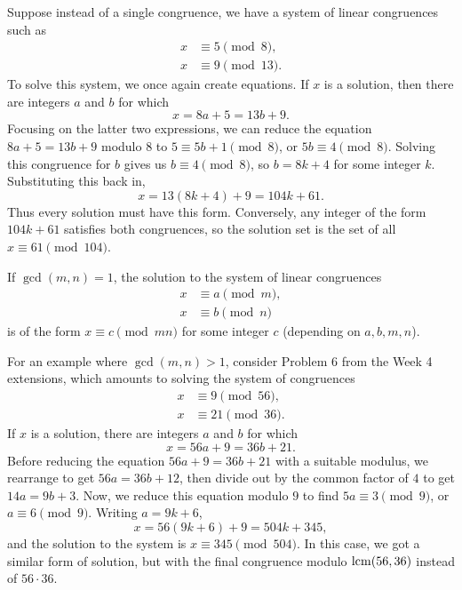 Suppose instead of a single congruence, we have a system of linear congruences such as
\begin{align*}
x &\equiv 5\pmod{8}, \\
x &\equiv 9\pmod{13}.
\end{align*}
To solve this system, we once again create equations. If $x$ is a solution, then there are integers $a$ and $b$ for which
\begin{equation*}
x = 8a + 5 = 13b + 9.
\end{equation*}
Focusing on the latter two expressions, we can reduce the equation $8a + 5 = 13b + 9$ modulo $8$ to $5\equiv 5b + 1\pmod{8}$, or $5b\equiv 4\pmod{8}$. Solving this congruence for $b$ gives us $b\equiv 4\pmod{8}$, so $b = 8k + 4$ for some integer $k$. Substituting this back in,
\begin{equation*}
x = 13(8k + 4) + 9 = 104k + 61.
\end{equation*}
Thus every solution must have this form. Conversely, any integer of the form $104k + 61$ satisfies both congruences, so the solution set is the set of all $x\equiv 61\pmod{104}$.

\begin{theorem}
If $\gcd(m,n) = 1$, the solution to the system of linear congruences
\begin{align*}
x &\equiv a\pmod{m}, \\
x &\equiv b\pmod{n}
\end{align*}
is of the form $x\equiv c\pmod{mn}$ for some integer $c$ (depending on $a,b,m,n$).
\end{theorem}

For an example where $\gcd(m,n) > 1$, consider Problem 6 from the Week 4 extensions, which amounts to solving the system of congruences
\begin{align*}
x &\equiv 9\pmod{56}, \\
x &\equiv 21\pmod{36}.
\end{align*}
If $x$ is a solution, there are integers $a$ and $b$ for which
\begin{equation*}
x = 56a + 9 = 36b + 21.
\end{equation*}
Before reducing the equation $56a + 9 = 36b + 21$ with a suitable modulus, we rearrange to get $56a = 36b + 12$, then divide out by the common factor of $4$ to get $14a = 9b + 3$. Now, we reduce this equation modulo $9$ to find $5a\equiv 3\pmod{9}$, or $a\equiv 6\pmod{9}$. Writing $a = 9k + 6$,
\begin{equation*}
x = 56(9k + 6) + 9 = 504k + 345,
\end{equation*}
and the solution to the system is $x\equiv 345\pmod{504}$. In this case, we got a similar form of solution, but with the final congruence modulo $\operatorname{lcm}(56,36)$ instead of $56\cdot 36$.

